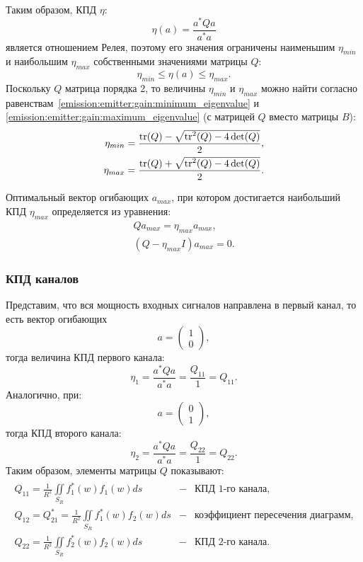 Таким образом, КПД $\eta$:
\[
    \eta(a) = \frac{a^* Q a}{a^* a}
\]
является отношением Релея, поэтому его значения ограничены наименьшим $\eta_{min}$ и наибольшим $\eta_{max}$ собственными значениями матрицы $Q$:
\[
    \eta_{min} \le \eta(a) \le \eta_{max} .
\]
Поскольку $Q$ матрица порядка 2, то величины $\eta_{min}$ и $\eta_{max}$ можно найти согласно равенствам~\eqref{emission:emitter:gain:minimum_eigenvalue} и
\eqref{emission:emitter:gain:maximum_eigenvalue} (с матрицей $Q$ вместо матрицы $B$):
\begin{align}
    \eta_{min} & = \frac{\operatorname{tr}(Q) - \sqrt{\operatorname{tr}^2(Q) - 4 \det(Q)}}{2}
    \label{emission:emitter:efficiency:minimum}, \\
    \eta_{max} & = \frac{\operatorname{tr}(Q) + \sqrt{\operatorname{tr}^2(Q) - 4 \det(Q)}}{2}
    \label{emission:emitter:efficiency:maximum} .
\end{align}

Оптимальный вектор огибающих $a_{max}$, при котором достигается наибольший КПД $\eta_{max}$ определяется из уравнения:
\begin{gather*}
    Q a_{max} = \eta_{max} a_{max} , \\
    (Q - \eta_{max} I ) a_{max} = 0.
\end{gather*}

\subsubsection{КПД каналов}

Представим, что вся мощность входных сигналов направлена в первый канал, то есть вектор огибающих
\[
    a
    = \begin{pmatrix}
          1 \\
          0
    \end{pmatrix} ,
\]
тогда величина КПД первого канала:
\[
    \eta_1
    = \frac{a^* Q a}{a^* a}
    = \frac{Q_{11}}{1}
    = Q_{11} .
\]
Аналогично, при:
\[
    a
    = \begin{pmatrix}
          0 \\
          1
    \end{pmatrix} ,
\]
тогда КПД второго канала:
\[
    \eta_2
    = \frac{a^* Q a}{a^* a}
    = \frac{Q_{22}}{1}
    = Q_{22} .
\]
Таким образом, элементы матрицы $Q$ показывают:
\begin{align*}
    \begin{array}{rcl}
        Q_{11} = \frac{1}{R^2} \iint \limits_{S_R} f_1^*(w) f_1(w) d s            & - & \text{КПД 1-го канала,}                  \\
        Q_{12} = Q_{21}^* = \frac{1}{R^2} \iint \limits_{S_R} f_1^*(w) f_2(w) d s & - & \text{коэффициент пересечения диаграмм,} \\
        Q_{22} = \frac{1}{R^2} \iint \limits_{S_R} f_2^*(w) f_2(w) d s            & - & \text{КПД 2-го канала.}
    \end{array}
\end{align*}

